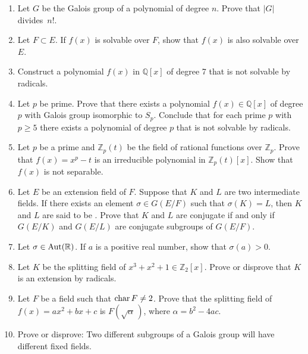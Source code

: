 {\begin{enumerate}
 
\item
Let $G$ be the Galois group of a polynomial of degree $n$.  Prove
that $|G|$ divides~$n!$.
 
 
\item
Let $F \subset E$.  If $f(x)$ is solvable over $F$, show that $f(x)$
is also solvable over $E$.
 
 
\item
Construct a polynomial $f(x)$ in ${\mathbb Q}[x]$ of degree 7 that is not
solvable by \linebreak radicals.
 
 
\item
Let $p$ be prime.  Prove that there exists a polynomial $f(x) \in
{\mathbb Q}[x]$ of degree $p$ with Galois group isomorphic to $S_p$.
Conclude that for each prime $p$ with $p \geq 5$ there exists a
polynomial of degree $p$ that is not solvable by radicals. 
 
 
\item
Let $p$ be a prime and ${\mathbb Z}_p(t)$ be the field of rational
functions over ${\mathbb Z}_p$.  Prove that $f(x) = x^p - t$ is an
irreducible polynomial in ${\mathbb Z}_p(t)[x]$.  Show that $f(x)$ is not
separable. 
 
 
\item
Let $E$ be an extension field of $F$. Suppose that $K$ and $L$ are two 
intermediate fields.  If there exists an element $\sigma \in G(E/F)$
such that $\sigma(K) = L$, then $K$ and $L$ are said to be .
Prove that $K$ and $L$ are conjugate if and only if $G(E/K)$ and
$G(E/L)$ are conjugate subgroups of $G(E/F)$. 
 
 
\item 
Let $\sigma \in \operatorname{Aut}( {\mathbb R} )$.  If $a$ is a positive real
number, show that $\sigma( a) > 0$.
 
 
\item 
Let $K$ be the splitting field of $x^3 + x^2 + 1 \in {\mathbb Z}_2[x]$.
Prove or disprove that $K$ is an extension by radicals.
 
\item
Let $F$ be a field such that ${\rm char}\, F \neq 2$. Prove that the
splitting field of $f(x) = a x^2 + b x + c$ is $F( \sqrt{\alpha}\, )$,
where $\alpha = b^2 - 4ac$. 
 
 
\item
Prove or disprove: Two different subgroups of a Galois group will
have different fixed fields.
 
 
 

\end{enumerate}}

